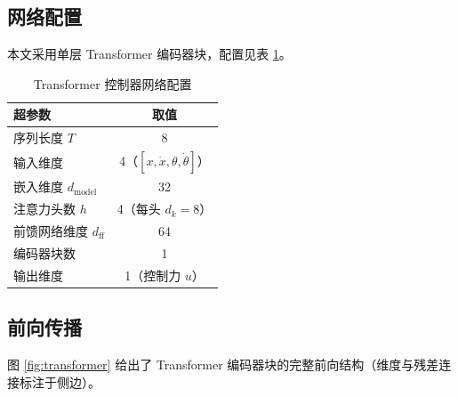 \documentclass[11pt,a4paper]{article}
\begin{document}
\subsection{网络配置}

本文采用单层 Transformer 编码器块，配置见表 \ref{tab:net}。

\begin{table}[H]
\centering
\caption{Transformer 控制器网络配置}
\label{tab:net}
\begin{tabular}{@{}lc@{}}
\toprule
超参数 & 取值 \\
\midrule
序列长度 $T$ & 8 \\
输入维度 & 4（$[x, \dot x, \theta, \dot\theta]$） \\
嵌入维度 $d_{\mathrm{model}}$ & 32 \\
注意力头数 $h$ & 4（每头 $d_k = 8$） \\
前馈网络维度 $d_{\mathrm{ff}}$ & 64 \\
编码器块数 & 1 \\
输出维度 & 1（控制力 $u$） \\
\bottomrule
\end{tabular}
\end{table}

\subsection{前向传播}

图 \ref{fig:transformer} 给出了 Transformer 编码器块的完整前向结构（维度与残差连接标注于侧边）。
\end{document}
